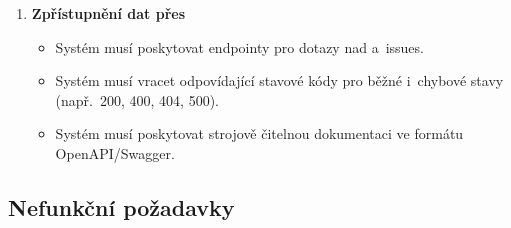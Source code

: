 \begin{enumerate}
  \item \textbf{Zpřístupnění dat přes \API}
    \begin{itemize}
      \item Systém musí poskytovat \REST \API endpointy pro dotazy nad \PR a~issues.
      \item Systém musí vracet odpovídající \HTTP stavové kódy pro běžné i~chybové stavy (např.\ 200, 400, 404, 500).
      \item Systém musí poskytovat strojově čitelnou dokumentaci \API ve formátu OpenAPI/Swagger.
    \end{itemize}
\end{enumerate}

\subsection{Nefunkční požadavky}
\label{subsec:requirements:nonfunctional}

